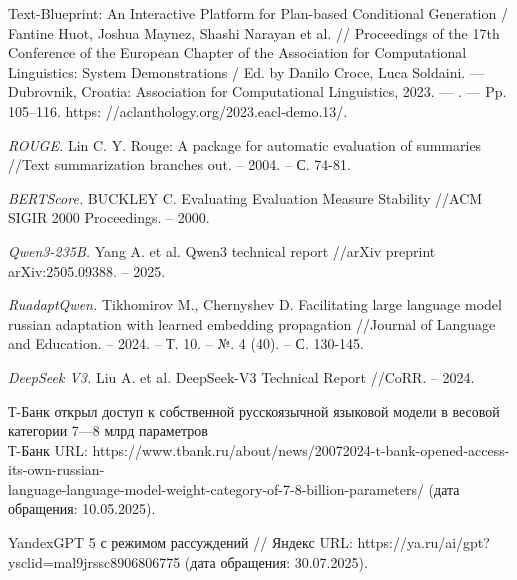 \documentclass{article}
\begin{document}
\begin{thebibliography}{99}
Text-Blueprint: An Interactive Platform for Plan-based Conditional Generation / \\Fantine Huot, Joshua Maynez, Shashi Narayan et al. // Proceedings of the 17th Conference of the European Chapter of the Association for Computational Linguistics:
System Demonstrations / Ed. by Danilo Croce, Luca Soldaini. — Dubrovnik, Croatia: Association for Computational Linguistics, 2023. — . — Pp. 105–116. https:
//aclanthology.org/2023.eacl-demo.13/.

\textit{ROUGE.}
Lin C. Y. Rouge: A package for automatic evaluation of summaries //Text summarization branches out. – 2004. – С. 74-81.

\textit{BERTScore.}
BUCKLEY C. Evaluating Evaluation Measure Stability //ACM SIGIR 2000 Proceedings. – 2000.

\textit{Qwen3-235B.}
Yang A. et al. Qwen3 technical report //arXiv preprint arXiv:2505.09388. – 2025.

\textit{RuadaptQwen.}
Tikhomirov M., Chernyshev D. Facilitating large language model russian adaptation with learned embedding propagation //Journal of Language and Education. – 2024. – Т. 10. – №. 4 (40). – С. 130-145.

\textit{DeepSeek V3.}
Liu A. et al. DeepSeek-V3 Technical Report //CoRR. – 2024.

Т-Банк открыл доступ к собственной русскоязычной языковой модели в весовой категории 7—8 млрд параметров\\ Т-Банк URL: https://www.tbank.ru/about/news/20072024-t-bank-opened-access-its-own-russian-\\language-language-model-weight-category-of-7-8-billion-parameters/ (дата обращения: 10.05.2025).

YandexGPT 5 с режимом рассуждений // Яндекс URL: https://ya.ru/ai/gpt?ysclid=mal9jrssc8906806775 (дата обращения: 30.07.2025).

\end{thebibliography}
\end{document}
